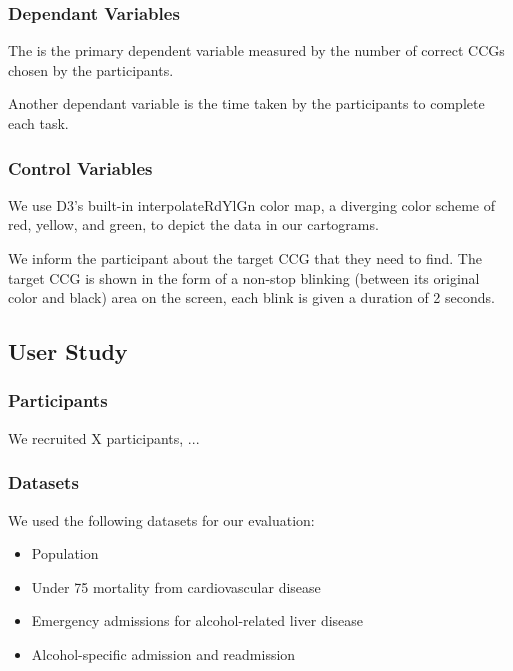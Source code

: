 \subsubsection{Dependant Variables}

 The is the primary dependent variable measured by the number of correct CCGs chosen by the participants.

 Another dependant variable is the time taken by the participants to complete each task.

\subsubsection{Control Variables}
 We use D3's built-in interpolateRdYlGn color map, a diverging color scheme of red, yellow, and green, to depict the data in our cartograms.

 We inform the participant about the target CCG that they need to find. The target CCG is shown in the form of a non-stop blinking (between its original color and black) area on the screen, each blink is given a duration of 2 seconds.

\subsection{User Study}

\subsubsection{Participants}

We recruited X participants, ...

\subsubsection{Datasets}

We used the following datasets for our evaluation:

\begin{itemize}
    \item Population
    \item Under 75 mortality from cardiovascular disease
    \item Emergency admissions for alcohol-related liver disease
    \item Alcohol-specific admission and readmission
\end{itemize}

